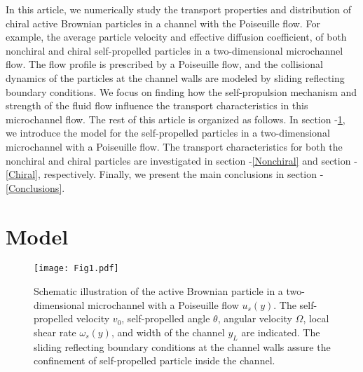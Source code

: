 \documentclass[aps,pre,preprint,superscriptaddress,amsmath,amssymb,nofootinbib]{revtex4}
\begin{document}
In this article, 
 we numerically study 
the transport properties and distribution of chiral active Brownian particles in a channel with the Poiseuille flow. 
For example, the average particle velocity and effective diffusion coefficient, of both nonchiral and chiral self-propelled particles in a two-dimensional microchannel flow.
The flow profile is prescribed by a Poiseuille flow, and the collisional dynamics of the particles at the channel walls are modeled by sliding reflecting boundary conditions. 
We focus on finding how the self-propulsion mechanism and strength of the fluid flow influence the transport characteristics in this microchannel flow. 
The rest of this article is organized as follows.
In section -\ref{Model}, we introduce the model for the self-propelled particles in a two-dimensional microchannel with a Poiseuille flow. 
The transport characteristics for both the nonchiral and chiral particles are investigated in section -\ref{Nonchiral} and section -\ref{Chiral}, respectively.
Finally, we present the main conclusions in section -\ref{Conclusions}. 


 
\section{Model}\label{Model}

\begin{figure}[htb!]
\centering
\texttt{[image: Fig1.pdf]}
\caption{Schematic illustration of the active Brownian particle in a two-dimensional microchannel with a Poiseuille flow $u_s(y)$. The self-propelled velocity $v_0$, self-propelled angle $\theta$, angular velocity $\Omega$, local shear rate $\omega_s (y)$, and width of the channel $y_L$ are indicated. 
The sliding reflecting boundary conditions at the channel walls assure the confinement of self-propelled particle inside the channel.}
\label{fig:chw}
\end{figure}
\end{document}
